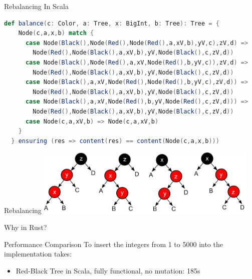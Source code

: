 \begin{frame}[fragile]{Rebalancing}
In Scala
\begin{lstlisting}[language=Scala, basicstyle=\footnotesize\ttfamily,]
def balance(c: Color, a: Tree, x: BigInt, b: Tree): Tree = {
    Node(c,a,x,b) match {
      case Node(Black(),Node(Red(),Node(Red(),a,xV,b),yV,c),zV,d) =>
        Node(Red(),Node(Black(),a,xV,b),yV,Node(Black(),c,zV,d))
      case Node(Black(),Node(Red(),a,xV,Node(Red(),b,yV,c)),zV,d) =>
        Node(Red(),Node(Black(),a,xV,b),yV,Node(Black(),c,zV,d))
      case Node(Black(),a,xV,Node(Red(),Node(Red(),b,yV,c),zV,d)) =>
        Node(Red(),Node(Black(),a,xV,b),yV,Node(Black(),c,zV,d))
      case Node(Black(),a,xV,Node(Red(),b,yV,Node(Red(),c,zV,d))) =>
        Node(Red(),Node(Black(),a,xV,b),yV,Node(Black(),c,zV,d))
      case Node(c,a,xV,b) => Node(c,a,xV,b)
    }
  } ensuring (res => content(res) == content(Node(c,a,x,b)))
\end{lstlisting}
\end{frame}

\begin{frame}{Rebalancing}
  \centering
  \includegraphics[width=0.8\textwidth]{img/rbtree_cases.png}
  \vfill
\end{frame}

\begin{frame}[standout]
  Why in Rust?
\end{frame}

\begin{frame}{Performance Comparison}
To insert the integers from 1 to 5000 into the implementation takes:
\begin{itemize}
  \item Red-Black Tree in Scala, fully functional, no mutation: 185s
\end{itemize}
\end{frame}

